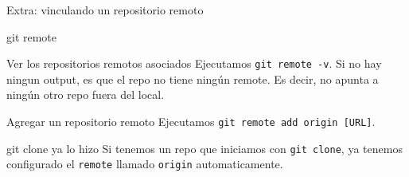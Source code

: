 \begin{frame}[t]{Extra: vinculando un repositorio remoto}
    \begin{comando}
        git remote
    \end{comando}

    \vspace{0.5em}
    \pause
    \begin{block}{Ver los repositorios remotos asociados}
        Ejecutamos \texttt{git remote -v}. Si no hay ningun output, es que el repo no tiene ningún remote. Es decir, no apunta a ningún otro repo fuera del local.
    \end{block}

    \pause
    \begin{block}{Agregar un repositorio remoto}
        Ejecutamos \texttt{git remote add origin [URL]}. %
    \end{block}

    \pause
    \begin{block}{git clone ya lo hizo}
        Si tenemos un repo que iniciamos con \texttt{git clone}, ya tenemos
        configurado el \texttt{remote} llamado \texttt{origin} automaticamente.
    \end{block}

\end{frame}

% 
% 
% 
% 
% 
